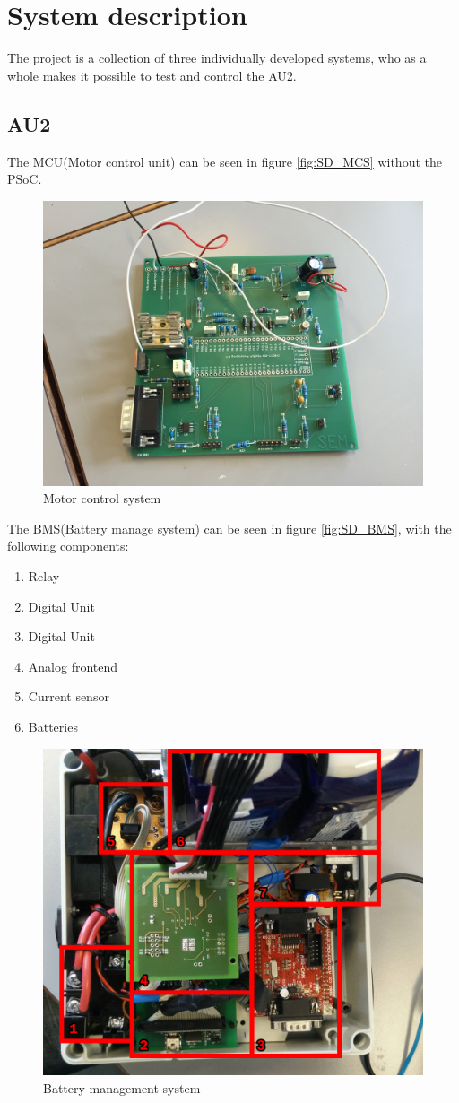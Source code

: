 \chapter{System description}
The project is a collection of three individually developed systems, who as a whole makes it possible to test and control the AU2.

\section{AU2}
The MCU(Motor control unit) can be seen in figure \vref{fig:SD_MCS} without the PSoC.

\begin{figure}[H]
	\centering
	\includegraphics[width=0.6\linewidth]{SubPages/Images/SD_MCS}
	\caption{Motor control system}
	\label{fig:SD_MCS}
\end{figure}

The BMS(Battery manage system) can be seen in figure \vref{fig:SD_BMS}, with the following components:

\begin{enumerate}
	\item Relay
	\item Digital Unit
	\item Digital Unit
	\item Analog frontend
	\item Current sensor
	\item Batteries
\end{enumerate}

\begin{figure}[H]
	\centering
	\includegraphics[width=0.7\linewidth]{SubPages/Images/SD_BMS}
	\caption{Battery management system}
	\label{fig:SD_BMS}
\end{figure}

